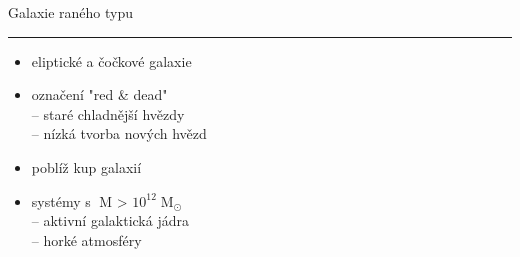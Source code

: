 \documentclass[aspectratio=43]{beamer}
\begin{document}
\begin{frame}{\vspace{-2mm}Galaxie raného typu\phantom{j$^1$}\\\vspace{1.5mm}\hrule}
\vspace{-0.2mm}
\begin{itemize}
    \item<1->[\color{white}=] eliptické a čočkové galaxie\\ \vspace{3.0mm}
    \item<2-> označení "red \& dead"\\ \vspace{1.4mm}
        -- staré chladnější hvězdy\\ \vspace{1.4mm}
        -- nízká tvorba nových hvězd\\ \vspace{3.0mm}
    \item<3-> poblíž kup galaxií\\ \vspace{3.0mm}
    \item<4-> systémy s $\;\text{M}$ > $10^{12} \; \text{M}_{\odot}$\\ \vspace{1.5mm}
        -- aktivní galaktická jádra\\ \vspace{1.5mm}
        -- horké atmosféry\\ \vspace{3.5mm}
\end{itemize}
\end{frame}
\end{document}

